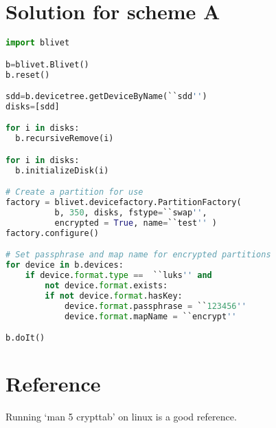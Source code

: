 \documentclass{article}
\begin{document}
\section{Solution for scheme A}
\begin{lstlisting}[language=python]
import blivet

b=blivet.Blivet()
b.reset()

sdd=b.devicetree.getDeviceByName(``sdd'')
disks=[sdd]

for i in disks:
  b.recursiveRemove(i)

for i in disks:
  b.initializeDisk(i)

# Create a partition for use
factory = blivet.devicefactory.PartitionFactory(
          b, 350, disks, fstype=``swap'',
          encrypted = True, name=``test'' )
factory.configure()

# Set passphrase and map name for encrypted partitions
for device in b.devices:
    if device.format.type ==  ``luks'' and 
        not device.format.exists:
        if not device.format.hasKey:
            device.format.passphrase = ``123456''
            device.format.mapName = ``encrypt''

b.doIt()
\end{lstlisting}

\section{Reference}

Running `man 5 crypttab' on linux is a good reference.
\end{document}
